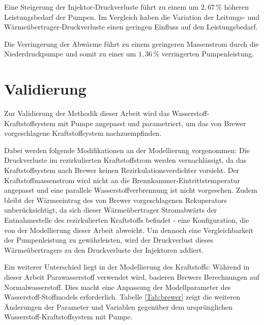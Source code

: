 Eine Steigerung der Injektor-Druckverluste führt zu einem um $2,67\,\%$ höheren Leistungsbedarf der Pumpen. Im Vergleich haben die Variation der Leitungs- und Wärmeübertrager-Druckverluste einen geringen Einfluss auf den Leistungsbedarf. 

Die Verringerung der Abwärme führt zu einem geringeren Massenstrom durch die Niederdruckpumpe und somit zu einer um $1,36\,\%$ verringerten Pumpenleistung.

\section{Validierung}

Zur Validierung der Methodik dieser Arbeit wird das Wasserstoff-Kraftstoffsystem mit Pumpe angepasst und parametriert, um das von Brewer \cite{Brewer.1991} vorgeschlagene Kraftstoffsystem nachzuempfinden. 

Dabei werden folgende Modifikationen an der Modellierung vorgenommen: Die Druckverluste im rezirkulierten Kraftstoffstrom werden vernachlässigt, da das Kraftstoffsystem nach Brewer keinen Rezirkulationsverdichter vorsieht. Der Kraftstoffmassenstrom wird nicht an die Brennkammer-Eintrittstemperatur angepasst und eine parallele Wasserstoffverbrennung ist nicht vorgesehen. Zudem bleibt der Wärmeeintrag des von Brewer vorgeschlagenen Rekuperators unberücksichtigt, da sich dieser Wärmeübertrager Stromabwärts der Entnahmestelle des rezirkulierten Kraftstoffs befindet - eine Konfiguration, die von der Modellierung dieser Arbeit abweicht. Um dennoch eine Vergleichbarkeit der Pumpenleistung zu gewährleisten, wird der Druckverlust dieses Wärmeübertragers zu den Druckverluste der Injektoren addiert. 

Ein weiterer Unterschied liegt in der Modellierung des Kraftstoffs: Während in dieser Arbeit Parawasserstoff verwendet wird, basieren Brewers Berechnungen auf Normalwasserstoff. Dies macht eine Anpassung der Modellparameter des Wasserstoff-Stoffmodels erforderlich. Tabelle \ref{Tab:brewer} zeigt die weiteren Änderungen der Parameter und Variablen gegenüber dem ursprünglichen Wasserstoff-Kraftstoffsystem mit Pumpe.

